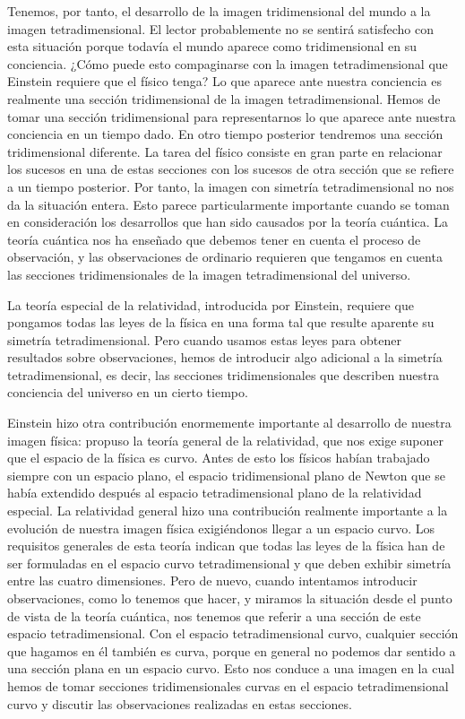 \documentclass[a4paper, 12pt]{article}
\begin{document}
Tenemos, por tanto, el desarrollo de la imagen tridimensional del mundo a la imagen tetradimensional. El lector probablemente no se sentirá satisfecho con esta situación porque todavía el mundo aparece como tridimensional en su conciencia. ¿Cómo puede esto compaginarse con la imagen tetradimensional que Einstein requiere que el físico tenga?
Lo que aparece ante nuestra conciencia es realmente una sección tridimensional de la imagen tetradimensional. Hemos de tomar una sección tridimensional para representarnos lo que aparece ante nuestra conciencia en un tiempo dado. En otro tiempo posterior tendremos una sección tridimensional diferente. La tarea del físico consiste en gran parte en relacionar los sucesos en una de estas secciones con los sucesos de otra sección que se refiere a un tiempo posterior. Por tanto, la imagen con simetría tetradimensional no nos da la situación entera. Esto parece particularmente importante cuando se toman en consideración los desarrollos que han sido causados por la teoría cuántica. La teoría cuántica nos ha enseñado que debemos tener en cuenta el proceso de observación, y las observaciones de ordinario requieren que tengamos en cuenta las secciones tridimensionales de la imagen tetradimensional del universo.

La teoría especial de la relatividad, introducida por Einstein, requiere que pongamos todas las leyes de la física en una forma tal que resulte aparente su simetría tetradimensional. Pero cuando usamos estas leyes para obtener resultados sobre observaciones, hemos de introducir algo adicional a la simetría tetradimensional, es decir, las secciones tridimensionales que describen nuestra conciencia del universo en un cierto tiempo.

Einstein hizo otra contribución enormemente importante al desarrollo de nuestra imagen física: propuso la teoría general de la relatividad, que nos exige suponer que el espacio de la física es curvo. Antes de esto los físicos habían trabajado siempre con un espacio plano, el espacio tridimensional plano de Newton que se había extendido después al espacio tetradimensional plano de la relatividad especial. La relatividad general hizo una contribución realmente importante a la evolución de nuestra imagen física exigiéndonos llegar a un espacio curvo. Los requisitos generales de esta teoría indican que todas las leyes de la física han de ser formuladas en el espacio curvo tetradimensional y que deben exhibir simetría entre las cuatro dimensiones. Pero de nuevo, cuando intentamos introducir observaciones, como lo tenemos que hacer, y miramos la situación desde el punto de vista de la teoría cuántica, nos tenemos que referir a una sección de este espacio tetradimensional. Con el espacio tetradimensional curvo, cualquier sección que hagamos en él también es curva, porque en general no podemos dar sentido a una sección plana en un espacio curvo. Esto nos conduce a una imagen en la cual hemos de tomar secciones tridimensionales curvas en el espacio tetradimensional curvo y discutir las observaciones realizadas en estas secciones.
\end{document}
